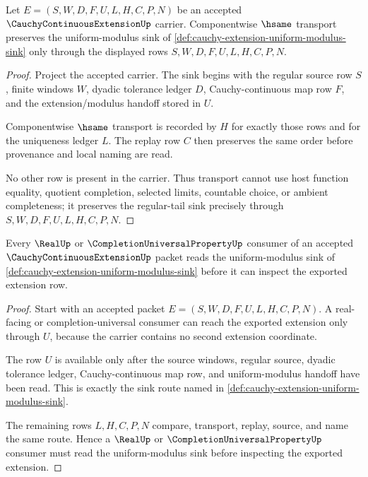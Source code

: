 \begin{theorem}
\label{thm:cauchy-extension-regular-tail-transport}
Let $E=(S,W,D,F,U,L,H,C,P,N)$ be an accepted $\CauchyContinuousExtensionUp$ carrier. Componentwise $\hsame$ transport preserves the uniform-modulus sink of \autoref{def:cauchy-extension-uniform-modulus-sink} only through the displayed rows $S,W,D,F,U,L,H,C,P,N$.
\end{theorem}
\begin{proof}
Project the accepted carrier. The sink begins with the regular source row $S$, finite windows $W$, dyadic tolerance ledger $D$, Cauchy-continuous map row $F$, and the extension/modulus handoff stored in $U$.

Componentwise $\hsame$ transport is recorded by $H$ for exactly those rows and for the uniqueness ledger $L$. The replay row $C$ then preserves the same order before provenance and local naming are read.

No other row is present in the carrier. Thus transport cannot use host function equality, quotient completion, selected limits, countable choice, or ambient completeness; it preserves the regular-tail sink precisely through $S,W,D,F,U,L,H,C,P,N$.
\end{proof}

\begin{theorem}
\label{thm:cauchy-extension-completion-consumer}
Every $\RealUp$ or $\CompletionUniversalPropertyUp$ consumer of an accepted $\CauchyContinuousExtensionUp$ packet reads the uniform-modulus sink of \autoref{def:cauchy-extension-uniform-modulus-sink} before it can inspect the exported extension row.
\end{theorem}
\begin{proof}
Start with an accepted packet $E=(S,W,D,F,U,L,H,C,P,N)$. A real-facing or completion-universal consumer can reach the exported extension only through $U$, because the carrier contains no second extension coordinate.

The row $U$ is available only after the source windows, regular source, dyadic tolerance ledger, Cauchy-continuous map row, and uniform-modulus handoff have been read. This is exactly the sink route named in \autoref{def:cauchy-extension-uniform-modulus-sink}.

The remaining rows $L,H,C,P,N$ compare, transport, replay, source, and name the same route. Hence a $\RealUp$ or $\CompletionUniversalPropertyUp$ consumer must read the uniform-modulus sink before inspecting the exported extension.
\end{proof}

